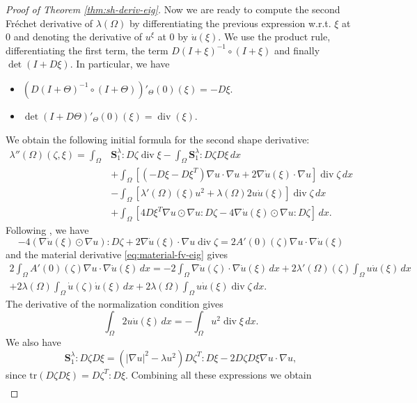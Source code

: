\documentclass[11pt]{article}
\numberwithin{equation}{section}\newtheorem*{jepEnonce}{\jepEnonceTitle}\newenvironment{enonce*}[1]{\def\jepEnonceTitle{#1}\jepEnonce}{\endjepEnonce}\newtheorem*{conj*}{Conjecture}
\theoremstyle{plain}
\theoremstyle{definition}
\newcommand{\di}{\operatorname{div}}
\newcommand{\bo}[1]{{\boldsymbol#1}}
\begin{document}
\begin{proof}[Proof of Theorem \ref{thm:sh-deriv-eig}]
Now we are ready to compute the second Fréchet derivative of $\lambda(\Omega)$ by differentiating the previous expression w.r.t. $\xi$ at $0$ and denoting the derivative of $u^\xi$ at $0$ by $\dot u(\xi)$. We use the product rule, differentiating the first term, the term $D(I+\xi)^{-1}\circ (I+\xi)$ and finally $\det(I+D\xi)$. In particular, we have
\begin{itemize}
\item $(D(I+\Theta)^{-1}\circ (I+\Theta))'_\Theta(0)(\xi) = - D\xi$.
\item $\det(I+D\Theta)'_\Theta(0)(\xi) = \di(\xi)$.
\end{itemize}

We obtain the following initial formula for the second shape derivative:
\begin{align*}
\lambda''(\Omega)(\zeta,\xi)  = \int_\Omega& \bo S_1^\lambda : D\zeta \di \xi - \int_\Omega \bo S_1^\lambda : D\zeta D\xi \, dx \\
&+ \int_\Omega [(-D\xi -D\xi^T) \nabla u \cdot \nabla u + 2 \nabla \dot u(\xi)\cdot \nabla u] \di \zeta\, dx \\
&-\int_\Omega [\lambda'(\Omega)(\xi) u^2 + \lambda(\Omega) 2 u \dot u(\xi)
]\di \zeta \, dx \\
&+\int_\Omega [4 D\xi^T \nabla u \odot \nabla u:D\zeta -4 \nabla \dot u(\xi) \odot \nabla u:D\zeta ]\, dx.
\end{align*}
Following \cite[p.\,25]{laurain2ndDeriv}, we have
\[
-4(\nabla \dot u(\xi) \odot \nabla u):D\zeta +2\nabla \dot u(\xi)\cdot \nabla u \di \zeta = 2A'(0)(\zeta)\nabla u \cdot \nabla \dot u(\xi)
\]
and the material derivative \eqref{eq:material-fv-eig} gives
\vspace*{-5pt}
\begin{multline*} 2\int_\Omega A'(0)(\zeta) \nabla u \cdot \nabla \dot u(\xi)\, dx = -2\int_\Omega \nabla \dot u(\zeta)\cdot \nabla \dot u(\xi) \, dx+2 \lambda'(\Omega)(\zeta) \int_\Omega u\dot u(\xi)\, dx\\
+2\lambda(\Omega)\int_\Omega \dot u(\zeta)\dot u(\xi)\, dx +2 \lambda(\Omega) \int_\Omega u\dot u(\xi)\di \zeta\, dx.
\end{multline*}
The derivative of the normalization condition gives
\[
\int_\Omega 2u\dot u(\xi) \, dx= - \int_\Omega u^2 \di \xi\, dx.
\]
We also have
\[
\bo S_1^\lambda : D\zeta D \xi = (|\nabla u|^2-\lambda u^2) D\zeta^T : D\xi - 2D\zeta D\xi \nabla u \cdot \nabla u,
\]
since $\text{tr} (D\zeta D\xi) = D\zeta^T: D\xi$.
Combining all these expressions we obtain
\begin{align*}

\end{align*}
\end{proof}
\end{document}
